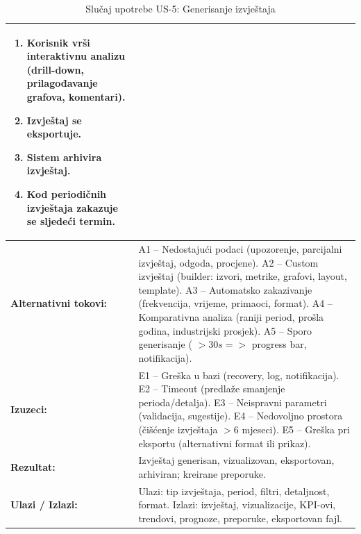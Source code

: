 \documentclass{article}
\begin{document}
\begin{table}[H]
\begin{tabular}{|>{\raggedright}p{3.5cm}|>{\raggedright\arraybackslash}p{11cm}|}
\begin{enumerate}[leftmargin=*, nosep]
    \item Korisnik vrši interaktivnu analizu (drill-down, prilagođavanje grafova, komentari).
    \item Izvještaj se eksportuje.
    \item Sistem arhivira izvještaj.
    \item Kod periodičnih izvještaja zakazuje se sljedeći termin. 
\end{enumerate} \\
\hline
\textbf{Alternativni tokovi:} & 
A1 – Nedostajući podaci (upozorenje, parcijalni izvještaj, odgoda, procjene).  
A2 – Custom izvještaj (builder: izvori, metrike, grafovi, layout, template).  
A3 – Automatsko zakazivanje (frekvencija, vrijeme, primaoci, format).  
A4 – Komparativna analiza (raniji period, prošla godina, industrijski prosjek).  
A5 – Sporo generisanje ( $ >30s =>$ progress bar, notifikacija). \\
\hline
\textbf{Izuzeci:} & 
E1 – Greška u bazi (recovery, log, notifikacija).  
E2 – Timeout (predlaže smanjenje perioda/detalja).  
E3 – Neispravni parametri (validacija, sugestije).  
E4 – Nedovoljno prostora (čišćenje izvještaja $>6$ mjeseci).  
E5 – Greška pri eksportu (alternativni format ili prikaz). \\
\hline
\textbf{Rezultat:} & Izvještaj generisan, vizualizovan, eksportovan, arhiviran; kreirane preporuke. \\
\hline
\textbf{Ulazi / Izlazi:} & 
Ulazi: tip izvještaja, period, filtri, detaljnost, format.  
Izlazi: izvještaj, vizualizacije, KPI-ovi, trendovi, prognoze, preporuke, eksportovan fajl. \\
\hline
\end{tabular}
\caption{Slučaj upotrebe US-5: Generisanje izvještaja}
\end{table}


\pagebreak
\end{document}
